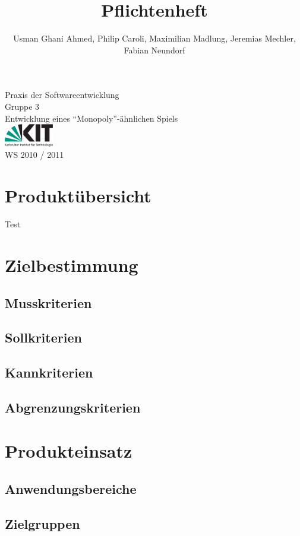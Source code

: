 \documentclass[a4paper,10pt]{article}
\title{Pflichtenheft}
\date{}
\author{Usman Ghani Ahmed, Philip Caroli, Maximilian Madlung, Jeremias Mechler, Fabian Neundorf}
\begin{document}
\maketitle
\begin{center}
\huge{Praxis der Softwareentwicklung \\
Gruppe 3 \\[0.5cm]
Entwicklung eines ``Monopoly''-ähnlichen Spiels \\[0.5cm]
\includegraphics[height=1cm]{kitlogo_de_rgb}  \\[0.5cm]
WS 2010 / 2011}
\end{center}

\newpage

\tableofcontents

\newpage

\section{Produktübersicht}
Test
\section{Zielbestimmung}
\subsection{Musskriterien}
\subsection{Sollkriterien}
\subsection{Kannkriterien}
\subsection{Abgrenzungskriterien}
\section{Produkteinsatz}
\subsection{Anwendungsbereiche}
\subsection{Zielgruppen}
\end{document}
